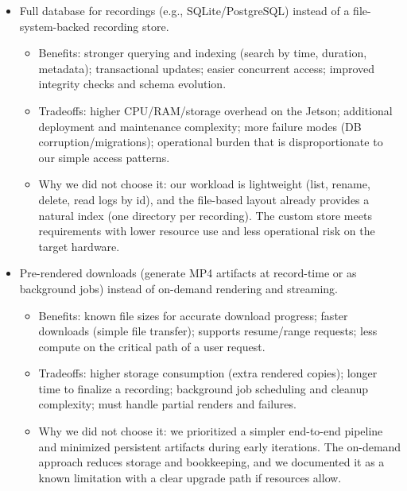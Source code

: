 \documentclass[12pt, titlepage]{article}
\begin{document}
\begin{enumerate}
\begin{itemize}
          \item Full database for recordings (e.g., SQLite/PostgreSQL) instead of a
                file-system-backed recording store.
                \begin{itemize}
                  \item Benefits: stronger querying and indexing (search by time, duration, metadata);
                        transactional updates; easier concurrent access; improved integrity checks and
                        schema evolution.
                  \item Tradeoffs: higher CPU/RAM/storage overhead on the Jetson; additional deployment
                        and maintenance complexity; more failure modes (DB corruption/migrations);
                        operational burden that is disproportionate to our simple access patterns.
                  \item Why we did not choose it: our workload is lightweight (list, rename, delete,
                        read logs by id), and the file-based layout already provides a natural index
                        (one directory per recording). The custom store meets requirements with lower
                        resource use and less operational risk on the target hardware.
                \end{itemize}

          \item Pre-rendered downloads (generate MP4 artifacts at record-time or as background
                jobs) instead of on-demand rendering and streaming.
                \begin{itemize}
                  \item Benefits: known file sizes for accurate download progress; faster downloads
                        (simple file transfer); supports resume/range requests; less compute on the
                        critical path of a user request.
                  \item Tradeoffs: higher storage consumption (extra rendered copies); longer time to
                        finalize a recording; background job scheduling and cleanup complexity; must
                        handle partial renders and failures.
                  \item Why we did not choose it: we prioritized a simpler end-to-end pipeline and
                        minimized persistent artifacts during early iterations. The on-demand approach
                        reduces storage and bookkeeping, and we documented it as a known limitation
                        with a clear upgrade path if resources allow.
                \end{itemize}


\end{itemize}
\end{enumerate}
\end{document}
